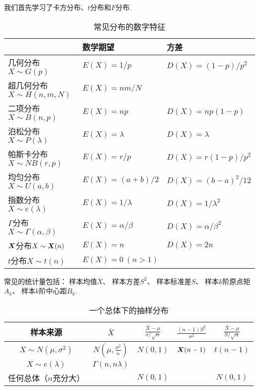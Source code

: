 我们首先学习了卡方分布、\(t\)分布和\(F\)分布.
\begin{table}[ht]
	\centering
	\begin{tabular}{p{3.5cm}|p{4cm}p{4cm}}
		\hline
		& 数学期望 & 方差 \\ \hline
		几何分布\newline\(X \sim G(p)\)
			& \(E(X) = 1/p\)
			& \(D(X) = (1-p)/p^2\) \\ \hline
		超几何分布\newline\(X \sim H(n,m,N)\)
			& \(E(X) = nm/N\) \\ \hline
		二项分布\newline\(X \sim B(n,p)\)
			& \(E(X) = np\)
			& \(D(X) = np(1-p)\) \\ \hline
		泊松分布\newline\(X \sim P(\lambda)\)
			& \(E(X) = \lambda\)
			& \(D(X) = \lambda\) \\ \hline
		帕斯卡分布\newline\(X \sim NB(r,p)\)
			& \(E(X) = r/p\)
			& \(D(X) = r(1-p)/p^2\) \\ \hline
		均匀分布\newline\(X \sim U(a,b)\)
			& \(E(X) = (a+b)/2\)
			& \(D(X) = (b-a)^2/12\) \\ \hline
		指数分布\newline\(X \sim e(\lambda)\)
			& \(E(X) = 1/\lambda\)
			& \(D(X) = 1/\lambda^2\) \\ \hline
		\(\Gamma\)分布\newline\(X \sim \Gamma(\alpha,\beta)\)
			& \(E(X) = \alpha/\beta\)
			& \(D(X) = \alpha/\beta^2\) \\ \hline
		\(\boldsymbol{X}\)分布\newline\(X \sim \boldsymbol{X}(n)\)
			& \(E(X) = n\)
			& \(D(X) = 2n\) \\ \hline
		\(t\)分布\newline\(X \sim t(n)\)
			& \(E(X) = 0\ (n>1)\) \\ \hline
	\end{tabular}
	\caption{常见分布的数字特征}
\end{table}

常见的统计量包括：
样本均值\(\overline{X}\)、
样本方差\(S^2\)、
样本标准差\(S\)、
样本\(k\)阶原点矩\(A_k\)、
样本\(k\)阶中心距\(B_k\).

\begin{table}[ht]
	\centering
	\begin{tabular}{*5c}
		\hline
		样本来源
			& \(\overline{X}\)
			& \(\frac{\overline{X}-\mu}{\sigma/\sqrt{n}}\)
			& \(\frac{(n-1)S^2}{\sigma^2}\)
			& \(\frac{\overline{X}-\mu}{S/\sqrt{n}}\)
			\\
		\hline
		\(X \sim N(\mu,\sigma^2)\)
			& \(N\left(\mu,\frac{\sigma^2}{n}\right)\)
			& \(N(0,1)\)
			& \(\boldsymbol{X}(n-1)\)
			& \(t(n-1)\)
			\\
		\(X \sim e(\lambda)\)
			& \(\Gamma(n,n\lambda)\)
			\\
		任何总体（\(n\)充分大）
			&
			& \(N(0,1)\)
			&
			& \(N(0,1)\)
			\\
		\hline
	\end{tabular}
	\caption{一个总体下的抽样分布}
\end{table}

